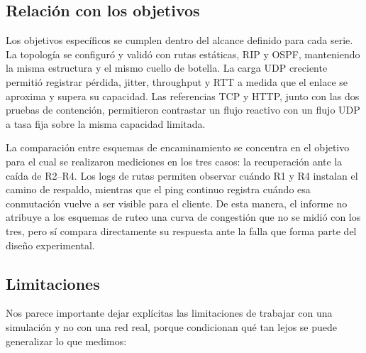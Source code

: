 \documentclass[11pt,a4paper]{article}
\begin{document}
\subsection*{Relaci\'on con los objetivos}

Los objetivos espec\'ificos se cumplen dentro del alcance definido para cada serie. La topolog\'ia se configur\'o y valid\'o con rutas est\'aticas, RIP y OSPF, manteniendo la misma estructura y el mismo cuello de botella. La carga UDP creciente permiti\'o registrar p\'erdida, jitter, throughput y RTT a medida que el enlace se aproxima y supera su capacidad. Las referencias TCP y HTTP, junto con las dos pruebas de contenci\'on, permitieron contrastar un flujo reactivo con un flujo UDP a tasa fija sobre la misma capacidad limitada.

La comparaci\'on entre esquemas de encaminamiento se concentra en el objetivo para el cual se realizaron mediciones en los tres casos: la recuperaci\'on ante la ca\'ida de R2--R4. Los logs de rutas permiten observar cu\'ando R1 y R4 instalan el camino de respaldo, mientras que el ping continuo registra cu\'ando esa conmutaci\'on vuelve a ser visible para el cliente. De esta manera, el informe no atribuye a los esquemas de ruteo una curva de congesti\'on que no se midi\'o con los tres, pero s\'i compara directamente su respuesta ante la falla que forma parte del dise\~no experimental.

\subsection*{Limitaciones}

Nos parece importante dejar expl\'icitas las limitaciones de trabajar con una simulaci\'on y no con una red real, porque condicionan qu\'e tan lejos se puede generalizar lo que medimos:
\end{document}
